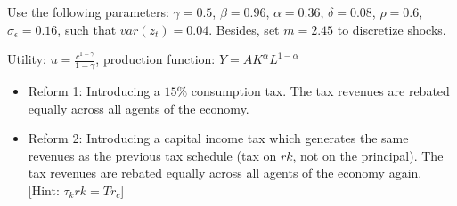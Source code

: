 \documentclass[11pt, a4paper, reqno]{article}
\begin{document}
 Use the following parameters: $\gamma=0.5$, $\beta=0.96$, $\alpha=0.36$, $\delta=0.08$, $\rho=0.6$, $\sigma_{\epsilon}=0.16$, such that $var(z_t)=0.04$. Besides, set $m=2.45$ to discretize shocks. \vspace{0.2in} 

Utility: $u=\frac{c^{1-\gamma}}{1-\gamma}$, production function: $Y=AK^{\alpha}L^{1-\alpha}$

\begin{itemize}
\item Reform 1: Introducing a $15\%$ consumption tax. The tax revenues are rebated
equally across all agents of the economy.

\item Reform 2: Introducing a  capital income tax which generates the same revenues as the previous tax schedule (tax on $r k$, not on the principal). The tax revenues are rebated equally across all agents of the
economy again. [Hint: $\tau_k rk=Tr_c$]

\end{itemize}
\end{document}

